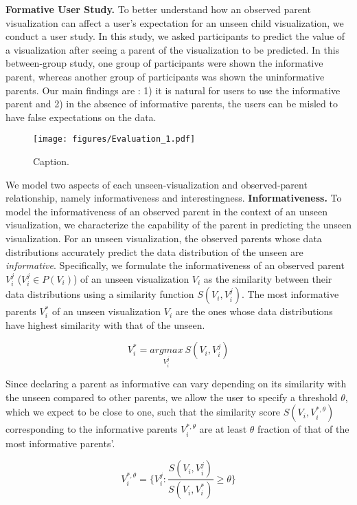 \textbf{Formative User Study.} To better understand how an observed parent visualization can affect a user's expectation for an unseen child visualization, we conduct a user study. In this study, we asked participants to predict the value of a visualization after seeing a parent of the visualization to be predicted. In this between-group study, one group of participants were shown the informative parent, whereas another group of participants was shown the uninformative parents. Our main findings are : 1) it is natural for users to use the informative parent and 2) in the absence of informative parents, the users can be misled to have false expectations on the data.
\begin{figure}[bht]
\label{example}
\texttt{[image: figures/Evaluation\_1.pdf]}
\caption{Caption.}
\end{figure}

We model two aspects of each unseen-visualization and observed-parent relationship, namely informativeness and interestingness. 
\textbf{Informativeness.} To model the informativeness of an observed parent in the context of an unseen visualization, we characterize the capability of the parent in predicting the unseen visualization. For an unseen visualization, the observed parents whose data distributions accurately predict the data distribution of the unseen are \emph{informative}. Specifically, we formulate the informativeness of an observed parent $V_i^j$ ($V_i^j \in P(V_i)$) of an unseen visualization $V_i$ as the similarity between their data distributions using a similarity function $S(V_i, V_i^j)$. The most informative parents $V_i^*$ of an unseen visualization $V_i$ are the ones whose data distributions have highest similarity with that of the unseen.

\begin{equation}
    V_i^*=\underset{V_i^j}{argmax}\ S(V_i, V_i^j)
\end{equation}

Since declaring a parent as informative can vary depending on its similarity with the unseen compared to other parents, we allow the user to specify a threshold $\theta$, which we expect to be close to one, such that the similarity score $S(V_i, V_i^{*, \theta})$ corresponding to the informative parents $V_i^{*, \theta}$ are at least $\theta$ fraction of that of the most informative parents'.

\begin{equation}
    V_i^{*, \theta} = \{V_i^j : \frac{S(V_i, V_i^j)}{S(V_i, V_i^*)} \ge \theta\}
\end{equation}


